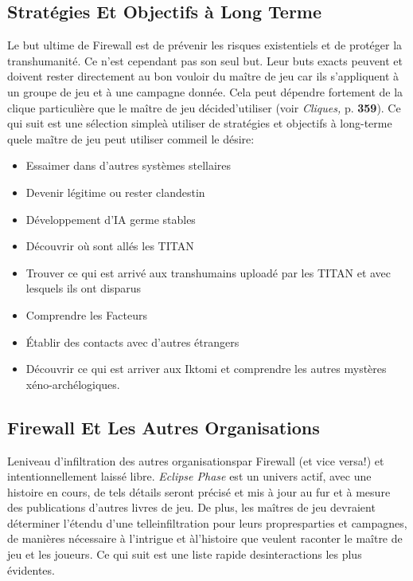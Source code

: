 \subsection{Stratégies Et Objectifs à Long Terme} 

Le but ultime de Firewall est de prévenir les risques existentiels et de protéger la transhumanité. Ce n'est cependant pas son seul but. Leur buts exacts peuvent et doivent rester directement au bon vouloir du maître de jeu car ils s'appliquent à un groupe de jeu et à une campagne donnée. Cela peut dépendre fortement de la clique particulière que le maître de jeu décided'utiliser (voir \textit{Cliques, } p. \textbf{359}). Ce qui suit est une sélection simpleà utiliser de stratégies et objectifs à long-terme quele maĩtre de jeu peut utiliser commeil le désire: 

\begin{itemize} \item Essaimer dans d'autres systèmes stellaires \item Devenir légitime ou rester clandestin \item Développement d'IA germe stables\item Découvrir où sont allés les TITAN \item Trouver ce qui est arrivé aux transhumains uploadé par les TITAN et avec lesquels ils ont disparus \item Comprendre les Facteurs \item Établir des contacts avec d'autres étrangers\item Découvrir ce qui est arriver aux Iktomi et comprendre les autres mystères xéno-archélogiques. \end{itemize} 



\subsection{Firewall Et Les Autres Organisations} 

Leniveau d'infiltration des autres organisationspar Firewall (et vice versa!) et intentionnellement laissé libre. \textit{Eclipse Phase }est un univers actif, avec une histoire en cours, de tels détails seront précisé et mis à jour au fur et à mesure des publications d'autres livres de jeu. De plus, les maîtres de jeu devraient déterminer l'étendu d'une telleinfiltration pour leurs propresparties et campagnes, de manières nécessaire à l'intrigue et àl'histoire que veulent raconter le maître de jeu et les joueurs. Ce qui suit est une liste rapide desinteractions les plus évidentes. 

